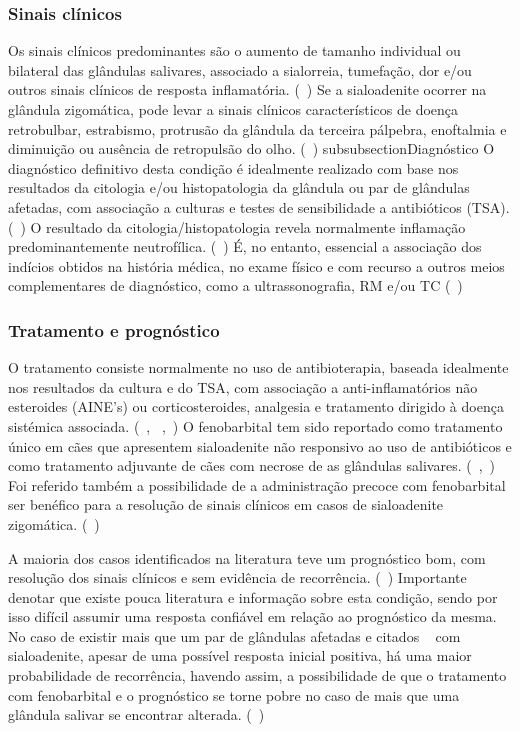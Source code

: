 \subsubsection{Sinais clínicos}
Os sinais clínicos predominantes são o aumento de tamanho individual ou bilateral das glândulas salivares, associado a sialorreia, tumefação, dor e/ou outros sinais clínicos de resposta inflamatória. (~\cite{McGill2009}) Se a sialoadenite ocorrer na glândula zigomática, pode levar a sinais clínicos característicos de doença retrobulbar, estrabismo, protrusão da glândula da terceira pálpebra, enoftalmia e diminuição ou ausência de retropulsão do olho. (~\cite{11cases})
subsubsection{Diagnóstico}
O diagnóstico definitivo desta condição é idealmente realizado com base nos resultados da citologia e/ou histopatologia da glândula ou par de glândulas afetadas, com associação a culturas e testes de sensibilidade a antibióticos (TSA). (~\cite{Enache2025}) O resultado da citologia/histopatologia   revela normalmente inflamação predominantemente neutrofílica. (~\cite{Enache2025}) É, no entanto, essencial a associação dos indícios obtidos na história médica, no exame físico e com recurso a outros meios complementares de diagnóstico, como a ultrassonografia, RM e/ou TC  (~\cite{Enache2025})

\subsubsection{Tratamento e prognóstico}

O tratamento consiste normalmente no uso de antibioterapia, baseada idealmente nos resultados da cultura e do TSA, com associação a anti-inflamatórios não esteroides (AINE’s) ou corticosteroides, analgesia e tratamento dirigido à doença sistémica associada. (~\cite{Park2022}, ~\cite{Enache2025},~\cite{sialadenite}) O fenobarbital tem sido reportado como tratamento único em cães que apresentem sialoadenite não responsivo ao uso de antibióticos e como tratamento adjuvante de cães com necrose de as glândulas salivares. (~\cite{Park2022},~\cite{Enache2025}) Foi referido também a possibilidade de a administração precoce com fenobarbital ser benéfico para a resolução de sinais clínicos em casos de sialoadenite zigomática. (~\cite{Martinez2018})


A maioria dos casos identificados na literatura teve um prognóstico bom, com resolução dos sinais clínicos e sem evidência de recorrência. (~\cite{sialadenite}) Importante denotar que existe pouca literatura e informação sobre esta condição, sendo por isso difícil assumir uma resposta confiável em relação ao prognóstico da mesma.   
No caso de existir mais que um par de glândulas afetadas e citados ~\cite{Kumar2017} com sialoadenite, apesar de uma possível resposta inicial positiva, há uma maior probabilidade de recorrência, havendo assim, a possibilidade de que o tratamento com fenobarbital e o prognóstico se torne pobre no caso de mais que uma glândula salivar se encontrar alterada. (~\cite{Park2022})

